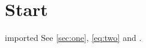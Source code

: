 \documentclass{report}
\begin{document}
\chapter{Start}\label{ch:start}




{imported}
See \ref{sec:one}, \ref{eq:two} and \cite{knuth}.
\end{document}
